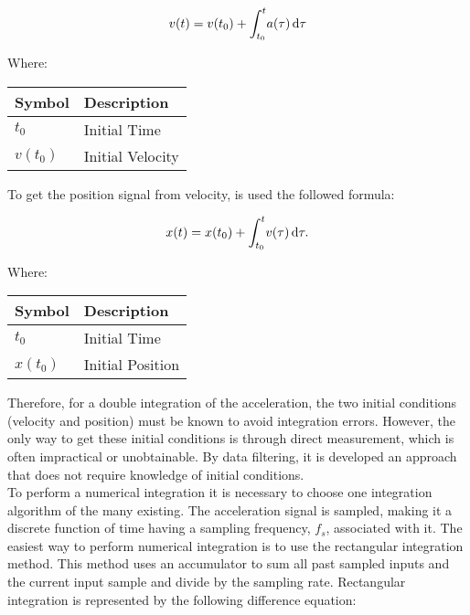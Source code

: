\documentclass[tesi]{subfiles}
\begin{document}
\begin{center}
\begin{equation}
 {\large v(t) = v(t_{0}) + \int_{t_{0}}^{t} \! a(\tau) \, \mathrm{d}\tau}
\end{equation}

Where: \\
\begin{table}[ht]
\centering
    \begin{tabular}{ | l | l |}
    
    \hline
    Symbol & Description \\ \hline
   \quad  $t_{0}$ & Initial Time \\ \hline
	   \quad  $v(t_{0})$ & Initial Velocity\\  
\hline 
    \end{tabular}
\end{table}
\end{center}

\noindent To get the position signal from velocity, is used the followed formula:
\begin{center}
\begin{equation}
 {\large x(t) = x(t_{0}) + \int_{t_{0}}^{t} \! v(\tau) \, \mathrm{d}\tau.}
\end{equation}

Where: \\
\begin{table}[ht]
\centering
    \begin{tabular}{ | l | l |}
    
    \hline
    Symbol & Description \\ \hline
   \quad  $t_{0}$ & Initial Time \\ \hline
	   \quad  $x(t_{0})$ & Initial Position \\  
\hline 
    \end{tabular}
\end{table}
\end{center}
\noindent Therefore, for a double integration of the acceleration, the two initial
conditions (velocity and position) must be known to avoid integration errors. However,
the only way to get these initial conditions is through direct measurement, which is often
impractical or unobtainable. By  data filtering, it is developed an approach that does not require knowledge of initial conditions.\\
To perform a numerical integration it is necessary to choose one integration algorithm of the many existing. 
The acceleration signal is sampled, making it a discrete function of time having a sampling frequency, $f_{s}$, associated with it. The easiest way to perform numerical integration is to use the rectangular integration method. This method uses an accumulator to sum all past sampled inputs and the current input sample and divide by the sampling rate. Rectangular integration is represented by the following difference equation:
\end{document}
